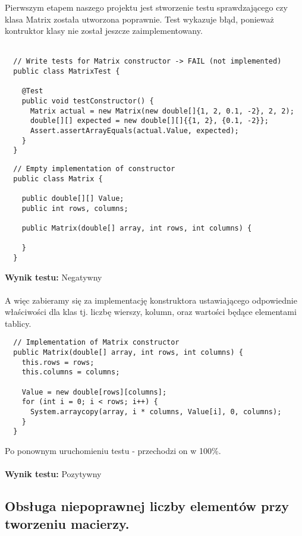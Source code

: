 \documentclass[a4paper,12pt,twoside]{article}
\begin{document}
Pierwszym etapem naszego projektu jest stworzenie testu sprawdzającego czy klasa Matrix
została utworzona poprawnie. Test wykazuje błąd, ponieważ kontruktor klasy nie został
jeszcze zaimplementowany.\\\\

\begin{lstlisting}
  // Write tests for Matrix constructor -> FAIL (not implemented)
  public class MatrixTest {

    @Test
    public void testConstructor() {
      Matrix actual = new Matrix(new double[]{1, 2, 0.1, -2}, 2, 2);
      double[][] expected = new double[][]{{1, 2}, {0.1, -2}};
      Assert.assertArrayEquals(actual.Value, expected);
    }
  }
\end{lstlisting}

\begin{lstlisting}
  // Empty implementation of constructor
  public class Matrix {

    public double[][] Value;
    public int rows, columns;

    public Matrix(double[] array, int rows, int columns) {

    }
  }
\end{lstlisting}
\medskip

\noindent
\textbf{Wynik testu: }{\color{red} Negatywny}\\\\
A więc zabieramy się za implementację konstruktora ustawiającego odpowiednie właściwości dla klas tj.
liczbę wierszy, kolumn, oraz wartości będące elementami tablicy.\\

\begin{lstlisting}
  // Implementation of Matrix constructor
  public Matrix(double[] array, int rows, int columns) {
    this.rows = rows;
    this.columns = columns;

    Value = new double[rows][columns];
    for (int i = 0; i < rows; i++) {
      System.arraycopy(array, i * columns, Value[i], 0, columns);
    }
  }
\end{lstlisting}
\medskip

\noindent
Po ponownym uruchomieniu testu - przechodzi on w 100\%.\\\\
\textbf{Wynik testu: }{\color{green} Pozytywny}


\subsection{Obsługa niepoprawnej liczby elementów przy tworzeniu macierzy.}
\bigskip
\end{document}

